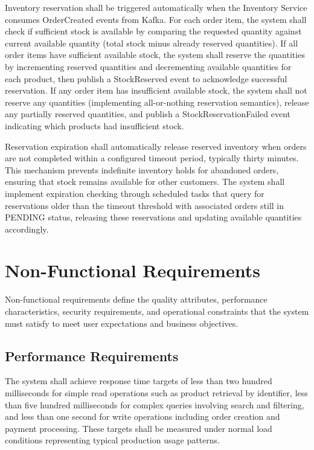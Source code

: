 Inventory reservation shall be triggered automatically when the Inventory Service consumes OrderCreated events from Kafka. For each order item, the system shall check if sufficient stock is available by comparing the requested quantity against current available quantity (total stock minus already reserved quantities). If all order items have sufficient available stock, the system shall reserve the quantities by incrementing reserved quantities and decrementing available quantities for each product, then publish a StockReserved event to acknowledge successful reservation. If any order item has insufficient available stock, the system shall not reserve any quantities (implementing all-or-nothing reservation semantics), release any partially reserved quantities, and publish a StockReservationFailed event indicating which products had insufficient stock.

Reservation expiration shall automatically release reserved inventory when orders are not completed within a configured timeout period, typically thirty minutes. This mechanism prevents indefinite inventory holds for abandoned orders, ensuring that stock remains available for other customers. The system shall implement expiration checking through scheduled tasks that query for reservations older than the timeout threshold with associated orders still in PENDING status, releasing these reservations and updating available quantities accordingly.

\section{Non-Functional Requirements}

Non-functional requirements define the quality attributes, performance characteristics, security requirements, and operational constraints that the system must satisfy to meet user expectations and business objectives.

\subsection{Performance Requirements}

The system shall achieve response time targets of less than two hundred milliseconds for simple read operations such as product retrieval by identifier, less than five hundred milliseconds for complex queries involving search and filtering, and less than one second for write operations including order creation and payment processing. These targets shall be measured under normal load conditions representing typical production usage patterns.

